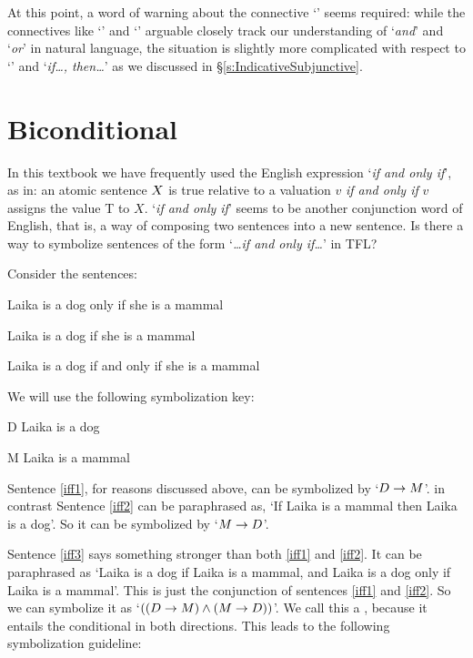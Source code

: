  At this point, a word of warning about the connective `\eif'  seems required: while the connectives like `\eand' and `\eor' arguable closely track our understanding of `\emph{and}' and `\emph{or}' in natural language, the situation is slightly more complicated with respect to `\eif' and `\emph{if\ldots, then\ldots}' as we discussed in \S\ref{s:IndicativeSubjunctive}.

\section{Biconditional}
In this textbook we have frequently used the English expression `\emph{if and only if}', as in: an atomic sentence $X$ is true relative to a valuation $v$ \emph{if and only if} $v$ assigns the value T to $X$. `\emph{if and only if}' seems to be another conjunction word of English, that is, a way of composing two sentences into a new sentence. Is there a way to symbolize sentences of the form `\emph{\ldots if and only if\ldots}' in TFL?

Consider the sentences:
	\begin{earg}
		\item[\ex{iff1}] Laika is a dog only if she is a mammal
		\item[\ex{iff2}] Laika is a dog if she is a mammal
		\item[\ex{iff3}] Laika is a dog if and only if she is a mammal
	\end{earg}
We will use the following symbolization key:
	\begin{ekey}
		\item[D] Laika is a dog
		\item[M] Laika is a mammal
	\end{ekey}
Sentence \ref{iff1}, for reasons discussed above, can be symbolized by `$D \rightarrow M$'. in contrast Sentence \ref{iff2} can be paraphrased as, `If Laika is a mammal then Laika is a dog'. So it can be symbolized by `$M \rightarrow D$'.

Sentence \ref{iff3} says something stronger than both \ref{iff1} and \ref{iff2}. It can be paraphrased as `Laika is a dog if Laika is a mammal, and Laika is a dog only if Laika is a mammal'. This is just the conjunction of sentences \ref{iff1} and \ref{iff2}. So we can symbolize it as `$((D \rightarrow M) \mathbin{\wedge} (M \rightarrow D))$'. We call this a , because it entails the conditional in both directions. This leads to the following symbolization guideline:

